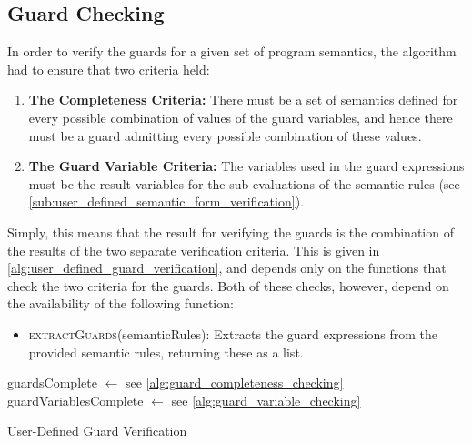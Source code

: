

\subsection{Guard Checking} %
\label{sub:guard_checking}
In order to verify the guards for a given set of program semantics, the algorithm had to ensure that two criteria held:
\begin{enumerate}
    \item \textbf{The Completeness Criteria:} There must be a set of semantics defined for every possible combination of values of the guard variables, and hence there must be a guard admitting every possible combination of these values.
    \item \textbf{The Guard Variable Criteria:} The variables used in the guard expressions must be the result variables for the sub-evaluations of the semantic rules (see \autoref{sub:user_defined_semantic_form_verification}).
\end{enumerate}

Simply, this means that the result for verifying the guards is the combination of the results of the two separate verification criteria.
This is given in \autoref{alg:user_defined_guard_verification}, and depends only on the functions that check the two criteria for the guards. 
Both of these checks, however, depend on the availability of the following function:
\begin{itemize}
    \item \textsc{extractGuards}(semanticRules): Extracts the guard expressions from the provided semantic rules, returning these as a list. 
\end{itemize}

\begin{algorithm}
\begin{algorithmic}
    \State guardsComplete $\gets$ 
    \Comment see \autoref{alg:guard_completeness_checking}
    \State guardVariablesComplete $\gets$ 
    \Comment see \autoref{alg:guard_variable_checking}
    \State {}
\EndFunction
\end{algorithmic}
\caption{User-Defined Guard Verification}
\label{alg:user_defined_guard_verification}
\end{algorithm}

